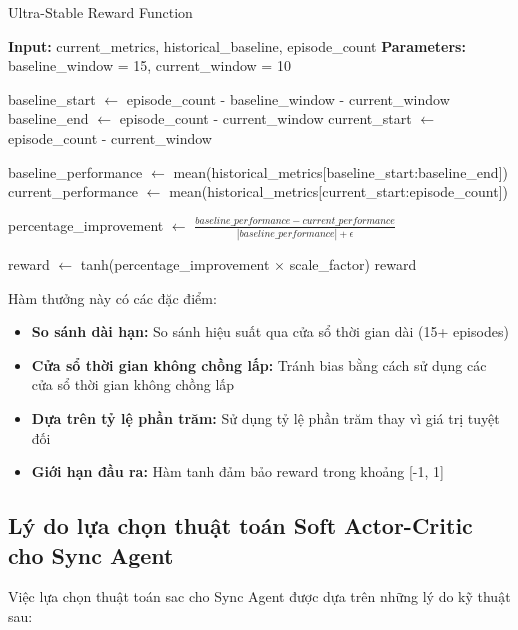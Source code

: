\begin{algorithm}[!htp]
    \caption{Ultra-Stable Reward Function}
    \begin{algorithmic}[1]
        \State \textbf{Input:} current\_metrics, historical\_baseline, episode\_count 
        \State \textbf{Parameters:} baseline\_window = 15, current\_window = 10 
             
        \EndIf
        
        \State baseline\_start $\leftarrow$ episode\_count - baseline\_window - current\_window
        \State baseline\_end $\leftarrow$ episode\_count - current\_window
        \State current\_start $\leftarrow$ episode\_count - current\_window
        
        \State baseline\_performance $\leftarrow$ mean(historical\_metrics[baseline\_start:baseline\_end])
        \State current\_performance $\leftarrow$ mean(historical\_metrics[current\_start:episode\_count])
        
        \State percentage\_improvement $\leftarrow$ $\frac{baseline\_performance - current\_performance}{|baseline\_performance| + \epsilon}$
        
        \State reward $\leftarrow$ tanh(percentage\_improvement $\times$ scale\_factor)
        \Return reward
    \end{algorithmic}
\end{algorithm}

Hàm thưởng này có các đặc điểm:
\begin{itemize}
    \item \textbf{So sánh dài hạn:} So sánh hiệu suất qua cửa sổ thời gian
        dài (15+ episodes)

    \item \textbf{Cửa sổ thời gian không chồng lấp:} Tránh bias bằng cách sử dụng các cửa
        sổ thời gian không chồng lấp

    \item \textbf{Dựa trên tỷ lệ phần trăm:} Sử dụng tỷ lệ phần trăm thay vì giá trị
        tuyệt đối

    \item \textbf{Giới hạn đầu ra:} Hàm tanh đảm bảo reward trong khoảng [-1, 1]
\end{itemize}

\subsection{Lý do lựa chọn thuật toán Soft Actor-Critic cho Sync Agent}
Việc lựa chọn thuật toán \ac{sac} cho Sync Agent được dựa trên những lý do kỹ thuật sau:

